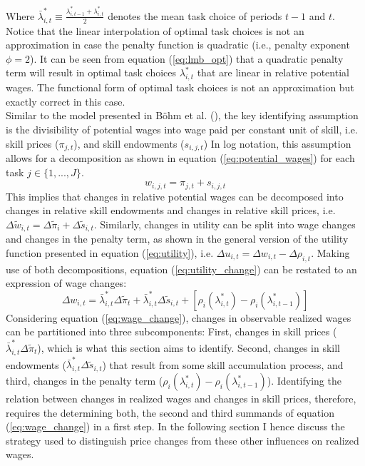 \documentclass[../main.tex]{subfiles}
\begin{document}
Where $\bar{\lambda}_{i,t}^* \equiv \frac{\lambda_{i,t-1}^* + \lambda_{i,t}^*}{2}$ denotes the mean task choice of periods $t-1$ and $t$. Notice that the linear interpolation of optimal task choices is not an approximation in case the penalty function is quadratic (i.e., penalty exponent $\phi = 2$). It can be seen from equation (\ref{eq:lmb_opt}) that a quadratic penalty term will result in optimal task choices $\lambda_{i,t}^*$ that are linear in relative potential wages. The functional form of optimal task choices is not an approximation but exactly correct in this case.
\\ 
Similar to the model presented in Böhm et al. (\citeyear{bohm2019occupation}), the key identifying assumption is the divisibility of potential wages into wage paid per constant unit of skill, i.e. skill prices ($\pi_{j,t}$), and skill endowments ($s_{i,j,t}$) In log notation, this assumption allows for a decomposition as shown in equation (\ref{eq:potential_wages}) for each task $j \in \{1, ...,J\}$.
\begin{equation} \label{eq:potential_wages}
	w_{i,j,t} = \pi_{j,t} + s_{i,j,t} 
\end{equation}
This implies that changes in relative potential wages can be decomposed into changes in relative skill endowments and changes in relative skill prices, i.e. $\Delta \tilde{w}_{i,t} = \Delta \tilde{\pi}_i + \Delta \tilde{s}_{i,t}$. Similarly, changes in utility can be split into wage changes and changes in the penalty term, as shown in the general version of the utility function presented in equation (\ref{eq:utility}), i.e. $\Delta u_{i,t} = \Delta w_{i,t} - \Delta \rho_{i,t}$. Making use of both decompositions, equation (\ref{eq:utility_change}) can be restated to an expression of wage changes:
\begin{equation} \label{eq:wage_change}
 	\Delta w_{i,t} = \bar{\lambda}^*_{i,t} \Delta \tilde{\pi}_{t} + \bar{\lambda}^*_{i,t} \Delta \tilde{s}_{i,t} + \left[ \rho_{i}(\lambda_{i,t}^*) - \rho_{i}(\lambda_{i,t-1}^*) \right]
\end{equation} 
Considering equation (\ref{eq:wage_change}), changes in observable realized wages can be partitioned into three subcomponents: First, changes in skill prices ($\bar{\lambda}^*_{i,t} \Delta \tilde{\pi}_{t}$), which is what this section aims to identify. Second, changes in skill endowments ($\bar{\lambda}^*_{i,t} \Delta \tilde{s}_{i,t}$) that result from some skill accumulation process, and third, changes in the penalty term ($\rho_{i}(\lambda_{i,t}^*) - \rho_{i}(\lambda_{i,t-1}^*)$). Identifying the relation between changes in realized wages and changes in skill prices, therefore, requires the determining both, the second and third summands of equation (\ref{eq:wage_change}) in a first step. In the following section I hence discuss the strategy used to distinguish price changes from these other influences on realized wages.
\end{document}

